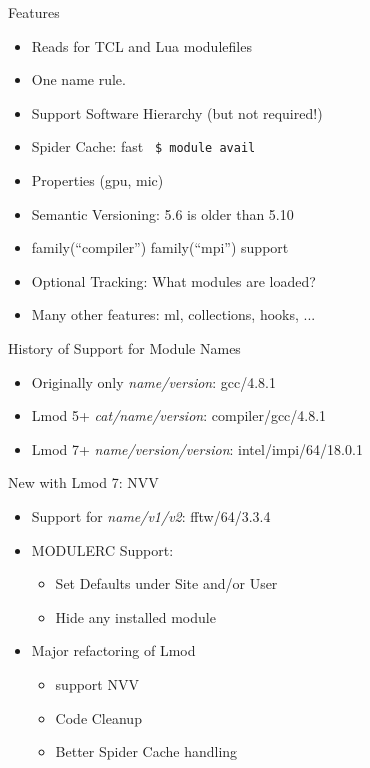 \documentclass{beamer}
\begin{document}
\begin{frame}{Features}
  \begin{itemize}
    \item Reads for TCL and Lua modulefiles
    \item One name rule.
    \item Support Software Hierarchy (but not required!)
    \item Spider Cache: fast \texttt{\color{blue} \$ module avail}
    \item Properties (gpu, mic)
    \item Semantic Versioning:  5.6 is older than 5.10
    \item family(``compiler'') family(``mpi'') support
    \item Optional Tracking: What modules are loaded?
    \item Many other features: ml, collections, hooks, ...
  \end{itemize}
\end{frame}

\begin{frame}{History of Support for Module Names}
  \begin{itemize}
    \item Originally only \emph{name/version}:  gcc/4.8.1
    \item Lmod 5+ \emph{cat/name/version}:  compiler/gcc/4.8.1
    \item Lmod 7+ \emph{name/version/version}: intel/impi/64/18.0.1
  \end{itemize}
\end{frame}

\begin{frame}{New with Lmod 7: NVV}
  \begin{itemize}
    \item Support for \emph{name/v1/v2}:  fftw/64/3.3.4
    \item MODULERC Support:
      \begin{itemize}
        \item Set Defaults under Site and/or User
        \item Hide any installed module
      \end{itemize}
    \item Major refactoring of Lmod 
      \begin{itemize}
        \item support NVV
        \item Code Cleanup
        \item Better Spider Cache handling
      \end{itemize}
  \end{itemize}
\end{frame}
\end{document}
